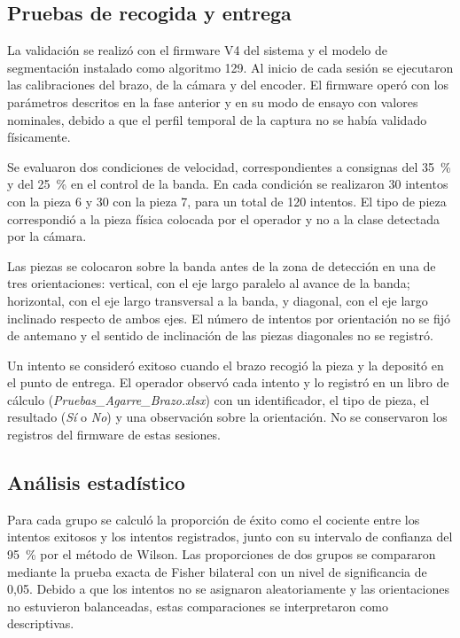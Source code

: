 \subsection{Pruebas de recogida y entrega}

La validación se realizó con el firmware V4 del sistema y el modelo de segmentación instalado como algoritmo 129. Al inicio de cada sesión se ejecutaron las calibraciones del brazo, de la cámara y del encoder. El firmware operó con los parámetros descritos en la fase anterior y en su modo de ensayo con valores nominales, debido a que el perfil temporal de la captura no se había validado físicamente.

Se evaluaron dos condiciones de velocidad, correspondientes a consignas del 35~\% y del 25~\% en el control de la banda. En cada condición se realizaron 30 intentos con la pieza 6 y 30 con la pieza 7, para un total de 120 intentos. El tipo de pieza correspondió a la pieza física colocada por el operador y no a la clase detectada por la cámara.

Las piezas se colocaron sobre la banda antes de la zona de detección en una de tres orientaciones: vertical, con el eje largo paralelo al avance de la banda; horizontal, con el eje largo transversal a la banda, y diagonal, con el eje largo inclinado respecto de ambos ejes. El número de intentos por orientación no se fijó de antemano y el sentido de inclinación de las piezas diagonales no se registró.

Un intento se consideró exitoso cuando el brazo recogió la pieza y la depositó en el punto de entrega. El operador observó cada intento y lo registró en un libro de cálculo (\textit{Pruebas\_Agarre\_Brazo.xlsx}) con un identificador, el tipo de pieza, el resultado (\textit{Sí} o \textit{No}) y una observación sobre la orientación. No se conservaron los registros del firmware de estas sesiones.

\subsection{Análisis estadístico}

Para cada grupo se calculó la proporción de éxito como el cociente entre los intentos exitosos y los intentos registrados, junto con su intervalo de confianza del 95~\% por el método de Wilson. Las proporciones de dos grupos se compararon mediante la prueba exacta de Fisher bilateral con un nivel de significancia de 0,05. Debido a que los intentos no se asignaron aleatoriamente y las orientaciones no estuvieron balanceadas, estas comparaciones se interpretaron como descriptivas.

